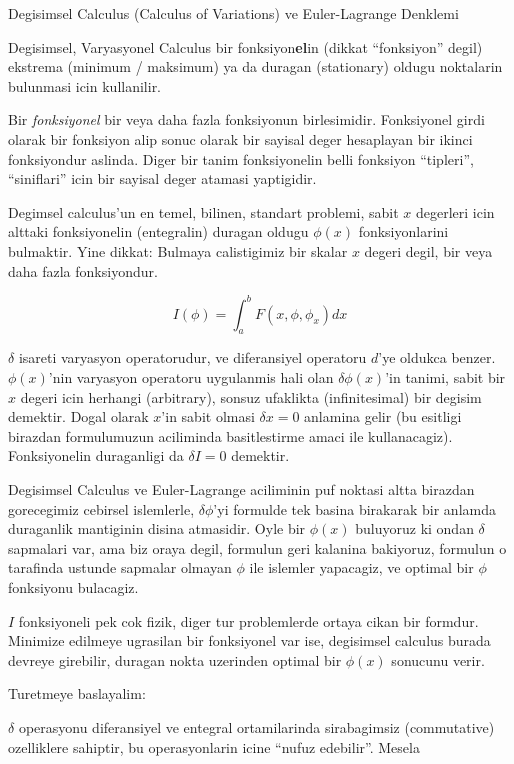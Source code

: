 \documentclass[12pt,fleqn]{article}\usepackage{../common}
\begin{document}
Degisimsel Calculus (Calculus of Variations) ve Euler-Lagrange Denklemi

Degisimsel, Varyasyonel Calculus bir fonksiyon\textbf{el}in (dikkat
``fonksiyon'' degil) ekstrema (minimum / maksimum) ya da duragan
(stationary) oldugu noktalarin bulunmasi icin kullanilir.

Bir {\em fonksiyonel} bir veya daha fazla fonksiyonun
birlesimidir. Fonksiyonel girdi olarak bir fonksiyon alip sonuc olarak
bir sayisal deger hesaplayan bir ikinci fonksiyondur aslinda. Diger
bir tanim fonksiyonelin belli fonksiyon ``tipleri'', ``siniflari''
icin bir sayisal deger atamasi yaptigidir.

Degimsel calculus'un en temel, bilinen, standart problemi, sabit $x$
degerleri icin alttaki fonksiyonelin (entegralin) duragan oldugu
$\phi(x)$ fonksiyonlarini bulmaktir. Yine dikkat: Bulmaya calistigimiz
bir skalar $x$ degeri degil, bir veya daha fazla fonksiyondur.

\[ I(\phi)=\int_a^b F(x,\phi,\phi_x)dx \]

$\delta$ isareti varyasyon operatorudur, ve diferansiyel operatoru
$d$'ye oldukca benzer. $\phi(x)$'nin varyasyon operatoru uygulanmis
hali olan $\delta \phi(x)$'in tanimi, sabit bir $x$ degeri icin
herhangi (arbitrary), sonsuz ufaklikta (infinitesimal) bir degisim
demektir. Dogal olarak $x$'in sabit olmasi $\delta x = 0$ anlamina
gelir (bu esitligi birazdan formulumuzun aciliminda basitlestirme
amaci ile kullanacagiz). Fonksiyonelin duraganligi da $\delta I = 0$
demektir.

Degisimsel Calculus ve Euler-Lagrange aciliminin puf noktasi altta
birazdan gorecegimiz cebirsel islemlerle, $\delta \phi$'yi formulde
tek basina birakarak bir anlamda duraganlik mantiginin disina
atmasidir. Oyle bir $\phi(x)$ buluyoruz ki ondan $\delta$ sapmalari
var, ama biz oraya degil, formulun geri kalanina bakiyoruz, formulun o
tarafinda ustunde sapmalar olmayan $\phi$ ile islemler yapacagiz, ve
optimal bir $\phi$ fonksiyonu bulacagiz.

$I$ fonksiyoneli pek cok fizik, diger tur problemlerde ortaya cikan
bir formdur. Minimize edilmeye ugrasilan bir fonksiyonel var ise,
degisimsel calculus burada devreye girebilir, duragan nokta uzerinden
optimal bir $\phi(x)$ sonucunu verir.

Turetmeye baslayalim:

$\delta$ operasyonu diferansiyel ve entegral ortamilarinda sirabagimsiz
(commutative) ozelliklere sahiptir, bu operasyonlarin icine ``nufuz edebilir''. 
Mesela
\end{document}
